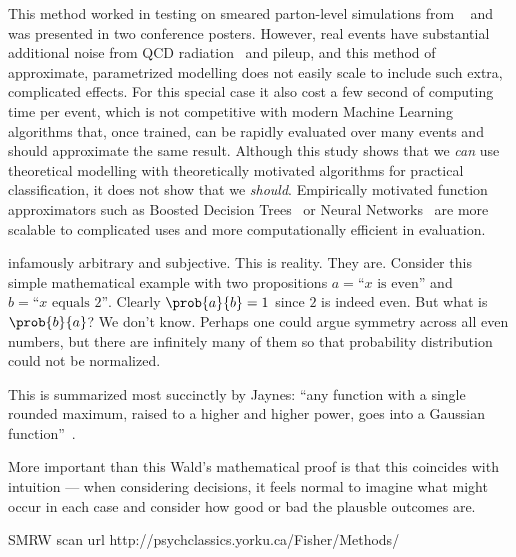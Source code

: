 This method worked in testing on smeared parton-level simulations from
\madgraph~\cite{Alwall:2014hca} and was presented in two conference posters.
However, real events have substantial additional noise from QCD
radiation~\cite{PhysRevD.83.074010} and pileup, and this method of approximate,
parametrized modelling does not easily scale to include such extra, complicated
effects.
For this special case it also cost a few second of computing time per event,
which is not competitive with modern Machine Learning algorithms that, once
trained, can be rapidly evaluated over many events and should approximate
the same result.
Although this study shows that we \emph{can} use theoretical modelling
with theoretically motivated algorithms for practical classification, it does
not show that we \emph{should}.
Empirically motivated function approximators such as
Boosted Decision Trees~\cite{xgboost} or
Neural Networks~\cite{MurphyKevinP.2012Mlap} are more scalable to complicated
uses and more computationally efficient in evaluation.


infamously arbitrary and subjective. This is reality. They are.
Consider this simple mathematical example with two propositions
$a=\textrm{``}x\textrm{ is even''}$ and
$b=\textrm{``}x\textrm{ equals }2\textrm{''}$.
Clearly $\prob{a}{b} = 1$ since $2$ is indeed even.
But what is $\prob{b}{a}$? We don't know. Perhaps one could argue symmetry
across all even numbers, but there are infinitely many of them so that
probability distribution could not be normalized.

\TODO{\ldots}

This is summarized most succinctly by Jaynes:
``any function with a single rounded maximum, raised to a higher and higher
power, goes into a Gaussian function''~\cite{jaynes2003probability}.


More important than this Wald's mathematical proof is that this coincides with
intuition --- when considering decisions, it feels normal to imagine what might
occur in each case and consider how good or bad the plausble outcomes are.

SMRW scan url http://psychclassics.yorku.ca/Fisher/Methods/




